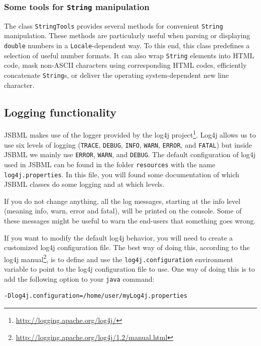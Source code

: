 \subsubsection{Some tools for \texttt{String} manipulation}

The class \texttt{StringTools}
%
provides several methods for convenient \texttt{String} manipulation. These
methods are particularly useful when parsing or displaying \texttt{double}
numbers in a \texttt{Locale}\hyp{}dependent way. To this end, this class
predefines a selection of useful number formats. It can also wrap
\texttt{String} elements into HTML code, mask non-ASCII characters using
corresponding HTML codes, efficiently concatenate \texttt{String}s, or deliver
the operating system\hyp{}dependent new line character.


\subsection{Logging functionality}
%

JSBML makes use of the logger provided by the log4j
project\footnote{\url{http://logging.apache.org/log4j/}}.
Log4j allows us to use six levels
of logging (\texttt{TRACE}, \texttt{DEBUG},
\texttt{INFO}, \texttt{WARN}, \texttt{ERROR}, and \texttt{FATAL}) but inside
JSBML we mainly use \texttt{ERROR}, \texttt{WARN}, and \texttt{DEBUG}. The
default configuration of log4j used in JSBML can be found in the folder
\texttt{resources} with the name \texttt{log4j.properties}.
In this file, you will found some documentation of which JSBML classes do some 
logging and at which levels. 
 
If you do not change anything, all the log messages, starting at the info level 
(meaning info, warn, error and fatal), will be printed on the console.
Some of these messages might be useful to warn the end-users that something
goes wrong.


If you want to modify the default log4j behavior, you will need to create a
customized log4j configuration file. The best way of doing this, according to
the log4j
manual\footnote{\url{http://logging.apache.org/log4j/1.2/manual.html}}, is to
define and use the \texttt{log4j.configuration} environment variable to point to
the log4j configuration file to use. One way of doing this is to add the
following option to your \texttt{java} command:
\begin{lstlisting}[language=bash,numbers=none,captionpos=t]
-Dlog4j.configuration=/home/user/myLog4j.properties
\end{lstlisting}

